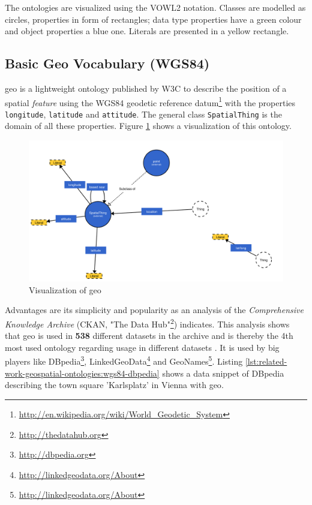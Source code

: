\documentclass[draft,final]{vutinfth} %
\begin{document}
The ontologies are visualized using the VOWL2 notation\cite{lohmann_vowl_2014}. Classes are modelled as circles, properties in form of rectangles; data type properties have a green colour and object properties a blue one. Literals are presented in a yellow rectangle.

\subsection{Basic Geo Vocabulary (WGS84)}
\label{related-work-geospatial-ontologies-wgs84}

\gls{geo}\cite{brickley_basic_2003} is a lightweight ontology published by W3C to describe the position of a spatial \textit{feature} using the WGS84 geodetic reference datum\footnote{\url{http://en.wikipedia.org/wiki/World_Geodetic_System}} with the properties \texttt{longitude}, \texttt{latitude} and \texttt{attitude}. The general class \texttt{SpatialThing} is the domain of all these properties. Figure \ref{fig:related-work-geospatial-ontologies:wgs84} shows a visualization of this ontology.

\begin{figure}[H]
    \centering    
    \includegraphics[width=\columnwidth]{graphics/vocabularies/wgs84.png}
    \caption{Visualization of \gls{geo}}
    \label{fig:related-work-geospatial-ontologies:wgs84}
\end{figure}

Advantages are its simplicity and popularity as an analysis of the \textit{Comprehensive Knowledge Archive} (CKAN, "The Data Hub"\footnote{\url{http://thedatahub.org}}) indicates. This analysis shows that \gls{geo} is used in \textbf{538} different datasets in the archive and is thereby the 4th most used ontology regarding usage in different datasets \cite{research_group:_akws_lodstats_????}. It is used by big players like DBpedia\footnote{\url{http://dbpedia.org}}, LinkedGeoData\footnote{\url{http://linkedgeodata.org/About}} and GeoNames\footnote{\url{http://linkedgeodata.org/About}}. 
Listing \ref{lst:related-work-geospatial-ontologies:wgs84-dbpedia} shows a data snippet of DBpedia describing the town square 'Karlsplatz' in Vienna with \gls{geo}.
\end{document}
